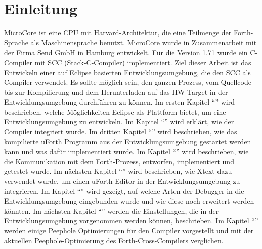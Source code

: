\chapter{Einleitung}

MicroCore ist eine CPU mit Harvard-Architektur, die eine Teilmenge der Forth-Sprache als Maschinensprache benutzt. MicroCore wurde in Zusammenarbeit mit der Firma Send GmbH in Hamburg entwickelt. Für die Version 1.71 wurde ein C-Compiler mit SCC (Stack-C-Compiler) implementiert. Ziel dieser Arbeit ist das Entwickeln einer auf Eclipse basierten Entwicklungsumgebung, die den SCC als Compiler verwendet. Es sollte möglich sein, den ganzen Prozess, vom Quellcode bis zur Kompilierung und dem Herunterladen auf das HW-Target in der Entwicklungsumgebung durchführen zu können. Im ersten Kapitel "`"' wird beschrieben, welche Möglichkeiten Eclipse als Plattform bietet, um eine Entwicklungsumgebung zu entwickeln. Im Kapitel "`"' wird erklärt, wie der Compiler integriert wurde. Im dritten Kapitel "`"' wird beschrieben, wie das kompilierte uForth Programm aus der Entwicklungsumgebung gestartet werden kann und was dafür implementiert wurde. Im Kapitel "`"' wird beschrieben, wie die Kommunikation mit dem Forth-Prozess, entworfen, implementiert und getestet wurde. Im nächsten Kapitel "`"' wird beschrieben, wie Xtext dazu verwendet wurde, um einen uForth Editor in der Entwicklungsumgebung zu integrieren. Im Kapitel "`"' wird gezeigt, auf welche Arten der Debugger in die Entwicklungsumgebung eingebunden wurde und wie diese noch erweitert werden könnten. Im nächsten Kapitel "`"' werden die Einstellungen, die in der Entwicklungsumgebung vorgenommen werden können, beschrieben. Im Kapitel "`"' werden einige Peephole Optimierungen für den Compiler vorgestellt und mit der aktuellen Peephole-Optimierung des Forth-Cross-Compilers verglichen.
